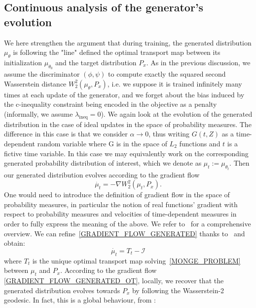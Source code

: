 \documentclass[runningheads]{llncs}
\newcommand\mycitet[1]{\cite{#1}}
\newcommand{\id}{\mathcal{I}}
\begin{document}
\subsection{Continuous analysis of the generator's evolution}
\label{subsection_dynamic_gradient_flow}
 We here strengthen the argument that during training, the generated distribution $\mu_\theta$ is following the "line" defined the optimal transport map between its initialization $\mu_{\theta_0}$ and the target distribution $P_x$. As in the previous discussion, we assume the discriminator $(\phi,\psi)$ to compute exactly the squared second Wasserstein distance $W_2^2(\mu_\theta,P_x)$, i.e. we suppose it is trained infinitely many times at each update of the generator, and we forget about the bias induced by the c-inequality constraint being encoded in the objective as a penalty (informally, we assume $\lambda_{\text{ineq}}=0$). We again look at the evolution of the generated distribution in the case of ideal updates in the space of probability measures. The difference in this case is that we consider $\alpha\rightarrow 0$, thus writing $G(t,Z)$ as a time-dependent random variable where G is in the space of $L_2$ functions and $t$ is a fictive time variable. In this case we may equivalently work on the corresponding generated probability distribution of interest, which we denote as $\mu_t:=\mu_{\theta_t}$. Then our generated distribution evolves according to the gradient flow
\begin{equation}
\dot{\mu_t}= - \nabla W_2^2(\mu_t,P_x).
\label{GRADIENT_FLOW_GENERATED}
\end{equation}
One would need to introduce the definition of gradient flow in the space of probability measures, in particular the notion of real functions' gradient with respect to probability measures and velocities of time-dependent measures in order to fully express the meaning of the above. We refer to~\mycitet{ambrosio2008gradient} for a comprehensive overview. 
We can refine~\eqref{GRADIENT_FLOW_GENERATED} thanks to~\mycitet{ambrosio2008gradient} and obtain:
\begin{equation}
\dot{\mu_t}= T_t-\id
\label{GRADIENT_FLOW_GENERATED_OT}
\end{equation}
where $T_t$ is the unique optimal transport map solving~\eqref{MONGE_PROBLEM} between $\mu_t$ and $P_x$. According to the gradient flow \eqref{GRADIENT_FLOW_GENERATED_OT}, locally, we recover that the generated distribution evolves towards $P_x$ by following the Wasserstein-2 geodesic. In fact, this is a global behaviour, from \mycitet{ambrosio2008gradient}:
\end{document}
